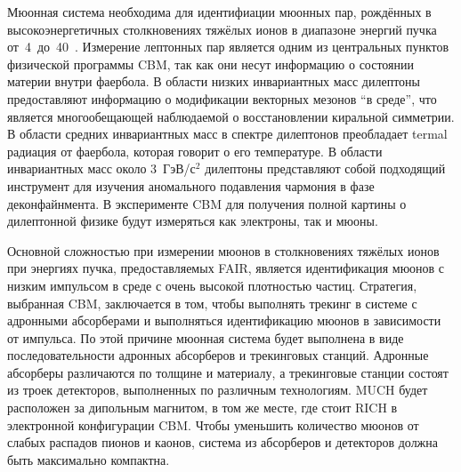 Мюонная система необходима для идентифиации мюонных пар, рождённых в высокоэнергетичных столкновениях тяжёлых ионов в диапазоне энергий пучка от~4~до~40~\GeVperNucl. Измерение лептонных пар является одним из центральных пунктов физической программы CBM, так как они несут информацию о состоянии материи внутри фаербола. В области низких инвариантных масс дилептоны предоставляют информацию о модификации векторных мезонов ``в среде'', что является многообещающей наблюдаемой о восстановлении киральной симметрии. В области средних инвариантных масс в спектре дилептонов преобладает termal \todo радиация от фаербола, которая говорит о его температуре. В области инвариантных масс около 3~ГэВ/с$^{2} $ дилептоны представляют собой подходящий инструмент для изучения аномального подавления чармония в фазе деконфайнмента. В эксперименте CBM для получения полной картины о дилептонной физике будут измеряться как электроны, так и мюоны.


Основной сложностью при измерении мюонов в столкновениях тяжёлых ионов при энергиях пучка, предоставляемых FAIR, является идентификация мюонов с низким импульсом в среде с очень высокой плотностью частиц. Стратегия, выбранная CBM, заключается в том, чтобы выполнять трекинг в системе с адронными абсорберами и выполняться идентификацию мюонов в зависимости от импульса. По этой причине мюонная система будет выполнена в виде последовательности адронных абсорберов и трекинговых станций. Адронные абсорберы различаются по толщине и материалу, а трекинговые станции состоят из троек детекторов, выполненных по различным технологиям. MUCH будет расположен за дипольным магнитом, в том же месте, где стоит RICH в электронной конфигурации CBM. Чтобы уменьшить количество мюонов от слабых распадов пионов и каонов, система из абсорберов и детекторов должна быть максимально компактна.

